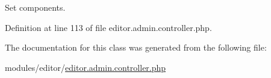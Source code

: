 Set components. 



Definition at line 113 of file editor.\+admin.\+controller.\+php.



The documentation for this class was generated from the following file\+:\begin{DoxyCompactItemize}
\item 
modules/editor/\hyperlink{editor_8admin_8controller_8php}{editor.\+admin.\+controller.\+php}\end{DoxyCompactItemize}
